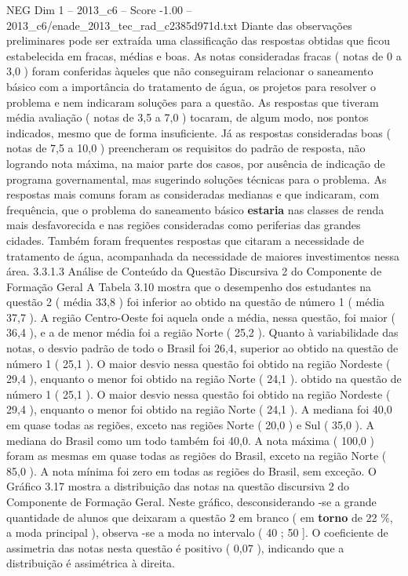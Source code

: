 \begin{textsample}{NEG Dim 1 – 2013\_c6 – Score -1.00 – 2013\_c6/enade\_2013\_tec\_rad\_c2385d971d.txt}
Diante das observações preliminares pode ser extraída uma classificação das respostas obtidas que ficou estabelecida em fracas, médias e boas.
As notas consideradas fracas ( notas de 0 a 3,0 ) foram conferidas àqueles que não conseguiram relacionar o saneamento básico com a importância do tratamento de água, os projetos para resolver o problema e nem indicaram soluções para a questão.
As respostas que tiveram média avaliação ( notas de 3,5 a 7,0 ) tocaram, de algum modo, nos pontos indicados, mesmo que de forma insuficiente.
Já as respostas consideradas boas ( notas de 7,5 a 10,0 ) preencheram os requisitos do padrão de resposta, não logrando nota máxima, na maior parte dos casos, por ausência de indicação de programa governamental, mas sugerindo soluções técnicas para o problema.
As respostas mais comuns foram as consideradas medianas e que indicaram, com frequência, que o problema do saneamento básico \textbf{estaria} nas classes de renda mais desfavorecida e nas regiões consideradas como periferias das grandes cidades.
Também foram frequentes respostas que citaram a necessidade de tratamento de água, acompanhada da necessidade de maiores investimentos nessa área. 3.3.1.3 Análise de Conteúdo da Questão Discursiva 2 do Componente de Formação Geral A Tabela 3.10 mostra que o desempenho dos estudantes na questão 2 ( média 33,8 ) foi inferior ao obtido na questão de número 1 ( média 37,7 ).
A região Centro-Oeste foi aquela onde a média, nessa questão, foi maior ( 36,4 ), e a de menor média foi a região Norte ( 25,2 ).
Quanto à variabilidade das notas, o desvio padrão de todo o Brasil foi 26,4, superior ao obtido na questão de número 1 ( 25,1 ).
O maior desvio nessa questão foi obtido na região Nordeste ( 29,4 ), enquanto o menor foi obtido na região Norte ( 24,1 ). obtido na questão de número 1 ( 25,1 ).
O maior desvio nessa questão foi obtido na região Nordeste ( 29,4 ), enquanto o menor foi obtido na região Norte ( 24,1 ).
A mediana foi 40,0 em quase todas as regiões, exceto nas regiões Norte ( 20,0 ) e Sul ( 35,0 ).
A mediana do Brasil como um todo também foi 40,0.
A nota máxima ( 100,0 ) foram as mesmas em quase todas as regiões do Brasil, exceto na região Norte ( 85,0 ).
A nota mínima foi zero em todas as regiões do Brasil, sem exceção.
O Gráfico 3.17 mostra a distribuição das notas na questão discursiva 2 do Componente de Formação Geral.
Neste gráfico, desconsiderando -se a grande quantidade de alunos que deixaram a questão 2 em branco ( em \textbf{torno} de 22 \%, a moda principal ), observa -se a moda no intervalo ( 40 ; 50 ].
O coeficiente de assimetria das notas nesta questão é positivo ( 0,07 ), indicando que a distribuição é assimétrica à direita.

\end{textsample}
